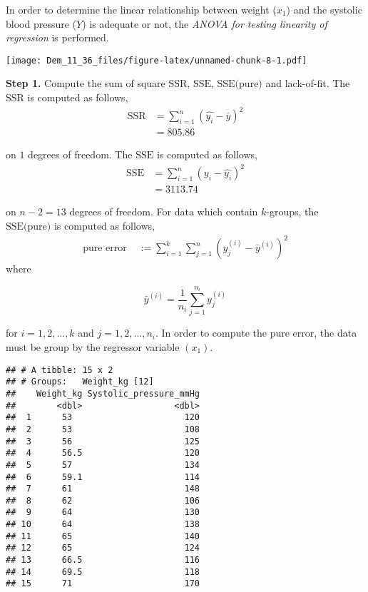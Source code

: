 \documentclass[
]{article}
\begin{document}
In order to determine the linear relationship between weight (\(x_1\))
and the systolic blood pressure (\(Y\)) is adequate or not, the
\emph{ANOVA for testing linearity of regression} is performed.

\texttt{[image: Dem\_11\_36\_files/figure-latex/unnamed-chunk-8-1.pdf]}

\textbf{Step 1.} Compute the sum of square
\(\text{SSR, SSE, SSE(pure)}\) and lack-of-fit. The \(\text{SSR}\) is
computed as follows, \[
\begin{aligned}
\text{SSR} &= \sum_{i = 1}^{n}(\hat{y_i} - \bar{y})^2 \\
&= 805.86
\end{aligned}
\]

on \(1\) degrees of freedom. The \(\text{SSE}\) is computed as follows,
\[
\begin{aligned}
\text{SSE} &= \sum_{i = 1}^{n}(y_i - \hat{y_i})^2 \\
&= 3113.74
\end{aligned}
\]

on \(n-2=13\) degrees of freedom. For data which contain \(k\)-groups,
the \(\text{SSE(pure)}\) is computed as follows, \[
\begin{aligned}
\text{pure error } &:= 
\sum_{i = 1}^{k}\sum_{j = 1}^n (y^{(i)}_j - \bar{y}^{(i)})^2
\end{aligned}
\] where

\[
\bar{y}^{(i)} = \frac{1}{n_i}\sum_{j = 1}^{n_i}y^{(i)}_j
\]

for \(i = 1, 2, \ldots, k\) and \(j = 1, 2, \ldots, n_i\). In order to
compute the pure error, the data must be group by the regressor variable
\((x_1)\).

\begin{verbatim}
## # A tibble: 15 x 2
## # Groups:   Weight_kg [12]
##    Weight_kg Systolic_pressure_mmHg
##        <dbl>                  <dbl>
##  1      53                      120
##  2      53                      108
##  3      56                      125
##  4      56.5                    120
##  5      57                      134
##  6      59.1                    114
##  7      61                      148
##  8      62                      106
##  9      64                      130
## 10      64                      138
## 11      65                      140
## 12      65                      124
## 13      66.5                    116
## 14      69.5                    118
## 15      71                      170
\end{verbatim}
\end{document}
